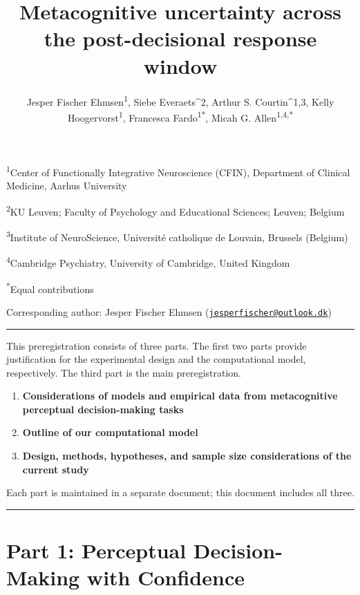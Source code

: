 \documentclass[
]{article}
\title{Metacognitive uncertainty across the post-decisional response
window}
\author{Jesper Fischer Ehmsen\textsuperscript{1}, Siebe Everaets\^{}2,
Arthur S. Courtin\^{}1,3, Kelly Hoogervorst\textsuperscript{1},
Francesca Fardo\textsuperscript{1*}, Micah G.
Allen\textsuperscript{1,4,*}}
\date{}
\providecommand{\tightlist}{%
  \setlength{\itemsep}{0pt}\setlength{\parskip}{0pt}}
\begin{document}
\maketitle

{
\hypersetup{linkcolor=}
\setcounter{tocdepth}{3}
\tableofcontents
}
\textsuperscript{1}Center of Functionally Integrative Neuroscience
(CFIN), Department of Clinical Medicine, Aarhus University

\textsuperscript{2}KU Leuven; Faculty of Psychology and Educational
Sciences; Leuven; Belgium

\textsuperscript{3}Institute of NeuroScience, Université catholique de
Louvain, Brussels (Belgium)

\textsuperscript{4}Cambridge Psychiatry, University of Cambridge, United
Kingdom

\textsuperscript{*}Equal contributions

Corresponding author: Jesper Fischer Ehmsen
(\href{mailto:jesperfischer@outlook.dk}{\nolinkurl{jesperfischer@outlook.dk}})

\begin{center}\rule{0.5\linewidth}{0.5pt}\end{center}

This preregistration consists of three parts. The first two parts
provide justification for the experimental design and the computational
model, respectively. The third part is the main preregistration.

\begin{enumerate}
\def\labelenumi{\arabic{enumi}.}
\tightlist
\item
  \textbf{Considerations of models and empirical data from metacognitive
  perceptual decision-making tasks}
\item
  \textbf{Outline of our computational model}
\item
  \textbf{Design, methods, hypotheses, and sample size considerations of
  the current study}
\end{enumerate}

Each part is maintained in a separate document; this document includes
all three.

\begin{center}\rule{0.5\linewidth}{0.5pt}\end{center}

\section{Part 1: Perceptual Decision-Making with
Confidence}\label{part-1-perceptual-decision-making-with-confidence}
\end{document}
